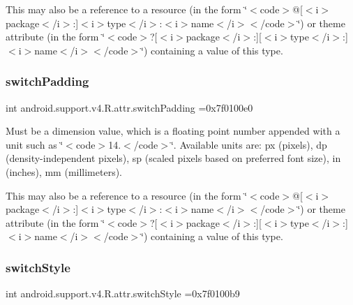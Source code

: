 This may also be a reference to a resource (in the form \char`\"{}$<$code$>$@\mbox{[}$<$i$>$package$<$/i$>$\+:\mbox{]}$<$i$>$type$<$/i$>$\+:$<$i$>$name$<$/i$>$$<$/code$>$\char`\"{}) or theme attribute (in the form \char`\"{}$<$code$>$?\mbox{[}$<$i$>$package$<$/i$>$\+:\mbox{]}\mbox{[}$<$i$>$type$<$/i$>$\+:\mbox{]}$<$i$>$name$<$/i$>$$<$/code$>$\char`\"{}) containing a value of this type. \mbox{\label{classandroid_1_1support_1_1v4_1_1R_1_1attr_ae0ed2143b3908d058aa5f5b0551d683d}} 
\subsubsection{\texorpdfstring{switch\+Padding}{switchPadding}}
{\footnotesize\ttfamily int android.\+support.\+v4.\+R.\+attr.\+switch\+Padding =0x7f0100e0\hspace{0.3cm}{\ttfamily [static]}}

Must be a dimension value, which is a floating point number appended with a unit such as \char`\"{}$<$code$>$14.\+5sp$<$/code$>$\char`\"{}. Available units are\+: px (pixels), dp (density-\/independent pixels), sp (scaled pixels based on preferred font size), in (inches), mm (millimeters). 

This may also be a reference to a resource (in the form \char`\"{}$<$code$>$@\mbox{[}$<$i$>$package$<$/i$>$\+:\mbox{]}$<$i$>$type$<$/i$>$\+:$<$i$>$name$<$/i$>$$<$/code$>$\char`\"{}) or theme attribute (in the form \char`\"{}$<$code$>$?\mbox{[}$<$i$>$package$<$/i$>$\+:\mbox{]}\mbox{[}$<$i$>$type$<$/i$>$\+:\mbox{]}$<$i$>$name$<$/i$>$$<$/code$>$\char`\"{}) containing a value of this type. \mbox{\label{classandroid_1_1support_1_1v4_1_1R_1_1attr_a80e91f4f034c963ef017cfc248a69164}} 
\subsubsection{\texorpdfstring{switch\+Style}{switchStyle}}
{\footnotesize\ttfamily int android.\+support.\+v4.\+R.\+attr.\+switch\+Style =0x7f0100b9\hspace{0.3cm}{\ttfamily [static]}}

